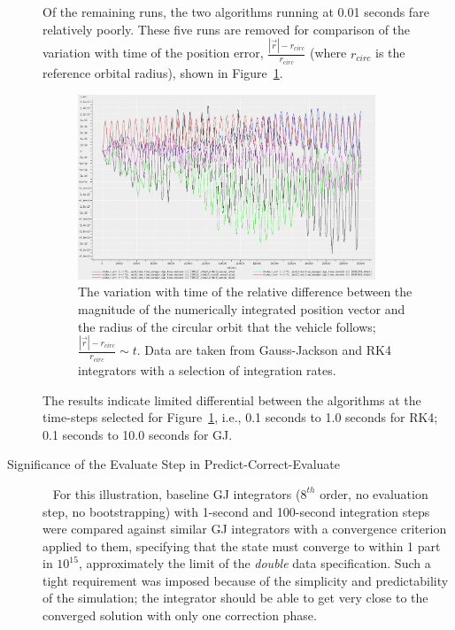 \begin{description}
Of the remaining runs, the two algorithms running at 0.01 seconds fare 
relatively poorly.  These five runs are removed for comparison of the 
variation with time of the position error, $\frac{|\vec{r}| - 
r_{circ}}{r_{circ}}$ (where $r_{circ}$ is the reference orbital radius), shown in 
Figure~\ref{fig:GJ_RK_performance}.

\begin{figure}[!ht]
\centering
\includegraphics[width=3.5in]{figures/GJ_RK_performance.jpg}
\caption[Variation with Time of Orbital Position Error]{The variation with 
time of the 
relative difference between the 
magnitude of the numerically integrated position vector and the radius of the 
circular orbit that the vehicle follows; $\frac{|\vec{r}| - 
r_{circ}}{r_{circ}} \sim t$.  Data are taken from Gauss-Jackson and RK4 
integrators with a selection of integration rates.}
\label{fig:GJ_RK_performance}
\end{figure}

The results indicate limited differential between the algorithms at the 
time-steps selected for Figure~\ref{fig:GJ_RK_performance}, i.e., 0.1 seconds 
to 1.0 seconds for RK4; 0.1 seconds to 10.0 seconds 
for GJ.

\item[Significance of the Evaluate Step in Predict-Correct-Evaluate]\ 
\newline
For this illustration, baseline GJ integrators ($8^{th}$ order, no evaluation 
step, no bootstrapping) with 1-second and 100-second integration steps were 
compared against similar GJ integrators with a convergence criterion applied 
to them, specifying that the state must converge to within 1 part in 
$10^{15}$, approximately the limit of the \textit{double} data specification. 
Such a tight requirement was imposed because of the simplicity and 
predictability of the simulation; the integrator should be able to get very 
close to the converged solution with only one correction phase.


\end{description}
